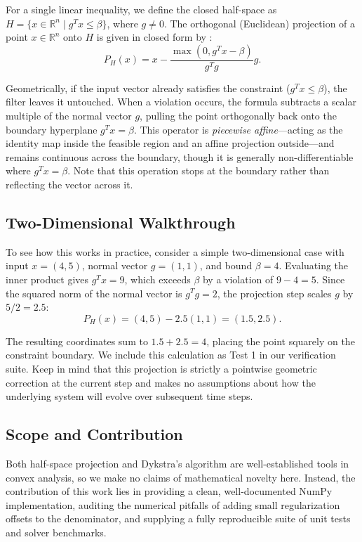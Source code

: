 \documentclass[11pt,a4paper]{article}
\begin{document}
For a single linear inequality, we define the closed half-space as $H = \{x \in \mathbb{R}^n \mid g^T x \le \beta\}$, where $g \neq 0$. The orthogonal (Euclidean) projection of a point $x \in \mathbb{R}^n$ onto $H$ is given in closed form by \cite{boyd2004}:
\[
P_H(x) = x - \frac{\max(0, g^T x - \beta)}{g^T g} g.
\]

Geometrically, if the input vector already satisfies the constraint ($g^T x \le \beta$), the filter leaves it untouched. When a violation occurs, the formula subtracts a scalar multiple of the normal vector $g$, pulling the point orthogonally back onto the boundary hyperplane $g^T x = \beta$. This operator is \emph{piecewise affine}---acting as the identity map inside the feasible region and an affine projection outside---and remains continuous across the boundary, though it is generally non-differentiable where $g^T x = \beta$. Note that this operation stops at the boundary rather than reflecting the vector across it.

\subsection{Two-Dimensional Walkthrough}
To see how this works in practice, consider a simple two-dimensional case with input $x = (4, 5)$, normal vector $g = (1, 1)$, and bound $\beta = 4$. Evaluating the inner product gives $g^T x = 9$, which exceeds $\beta$ by a violation of $9 - 4 = 5$. Since the squared norm of the normal vector is $g^T g = 2$, the projection step scales $g$ by $5 / 2 = 2.5$:
\[
P_H(x) = (4, 5) - 2.5(1, 1) = (1.5, 2.5).
\]

The resulting coordinates sum to $1.5 + 2.5 = 4$, placing the point squarely on the constraint boundary. We include this calculation as Test 1 in our verification suite. Keep in mind that this projection is strictly a pointwise geometric correction at the current step and makes no assumptions about how the underlying system will evolve over subsequent time steps.

\subsection{Scope and Contribution}
Both half-space projection \cite{boyd2004} and Dykstra's algorithm \cite{dykstra1983} are well-established tools in convex analysis, so we make no claims of mathematical novelty here. Instead, the contribution of this work lies in providing a clean, well-documented NumPy implementation, auditing the numerical pitfalls of adding small regularization offsets to the denominator, and supplying a fully reproducible suite of unit tests and solver benchmarks.
\end{document}
